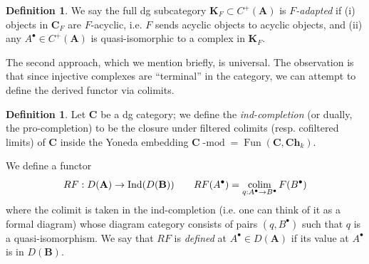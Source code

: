 \documentclass[10pt]{article}
\theoremstyle{definition}
\newtheorem{defn}[thm]{Definition}
\newcommand{\colim}{\operatornamewithlimits{colim}}
\DeclareMathOperator{\Ind}{Ind}
\DeclareMathOperator{\dmod}{-mod}
\DeclareMathOperator{\Fun}{Fun}
\newcommand{\cat}{\mathbf}
\begin{document}
\begin{defn}
We say the full dg subcategory $\cat{K}_F \subset C^+(\cat{A})$ is \emph{$F$-adapted} if (i) objects in $\cat{C}_F$ are $F$-acyclic, i.e. $F$ sends acyclic objects to acyclic objects, and (ii) any $A^\bullet \in C^+(\cat{A})$ is quasi-isomorphic to a complex in $\cat{K}_F$.
\end{defn}


The second approach, which we mention briefly, is universal.  The observation is that since injective complexes are ``terminal'' in the category, we can attempt to define the derived functor via colimits.
\begin{defn}
Let $\cat{C}$ be a dg category; we define the \emph{ind-completion} (or dually, the pro-completion) to be the closure under filtered colimits (resp. cofiltered limits) of $\cat{C}$ inside the Yoneda embedding $\cat{C}\dmod = \Fun(\cat{C}, \cat{Ch}_k)$.  


We define a functor
$$RF: D(\cat{A}) \rightarrow \Ind(D(\cat{B})) \;\;\;\;\;\;\;RF(A^\bullet) = \colim_{q: A^\bullet \rightarrow B^\bullet} F(B^\bullet)$$
 where the colimit is taken in the ind-completion (i.e. one can think of it as a formal diagram) whose diagram category consists of pairs $(q, B^\bullet)$ such that $q$ is a quasi-isomorphism.  We say that $RF$ is \emph{defined} at $A^\bullet \in D(\cat{A})$ if its value at $A^\bullet$ is in $D(\cat{B})$.
\end{defn}
\end{document}
